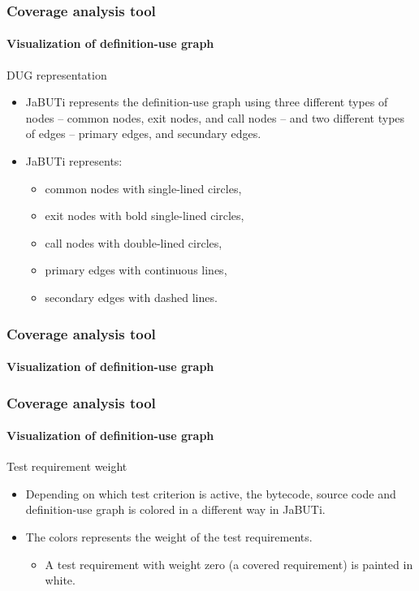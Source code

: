 \begin{frame}
\frametitle{Coverage analysis tool}
\framesubtitle{Visualization of definition-use graph}

\begin{block:fact}{DUG representation}
\begin{itemize}
	\item JaBUTi represents the definition-use graph using three different
	types of nodes -- common nodes, exit nodes, and call nodes -- and two
	different types of edges -- primary edges, and secundary edges.

	\item JaBUTi represents:
	\begin{itemize}
		\item common nodes with single-lined circles,

		\item exit nodes with bold single-lined circles,

		\item call nodes with double-lined circles,

		\item primary edges with continuous lines,

		\item secondary edges with dashed lines.
	\end{itemize}
\end{itemize}
\end{block:fact}
\end{frame}



\begin{frame}[c]
\frametitle{Coverage analysis tool}
\framesubtitle{Visualization of definition-use graph}

\begin{center}
\end{center}
\end{frame}


\begin{frame}
\frametitle{Coverage analysis tool}
\framesubtitle{Visualization of definition-use graph}

\begin{block:fact}{Test requirement weight}
\begin{itemize}
	\item Depending on which test criterion is active, the bytecode, source
	code and definition-use graph is colored in a different way in JaBUTi.

	\item The colors represents the weight of the test requirements.
	\begin{itemize}
		\item A test requirement with weight zero (a covered requirement) is
		painted in white.
	\end{itemize}
\end{itemize}
\end{block:fact}
\end{frame}



